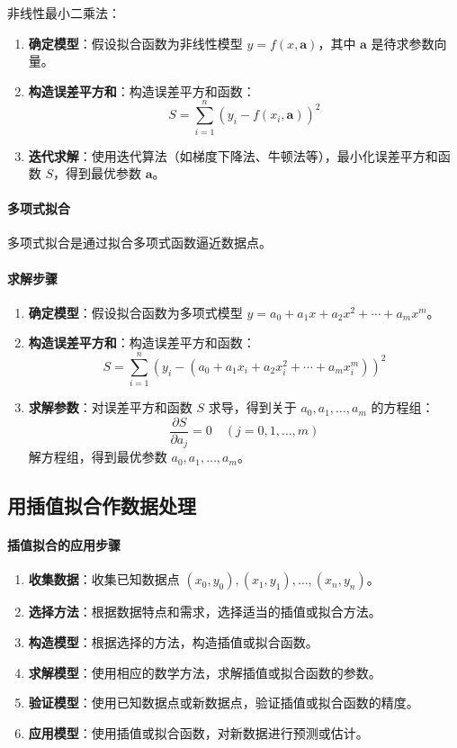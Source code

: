 \documentclass[UTF8]{ctexart}
\begin{document}
非线性最小二乘法：
\begin{enumerate}
    \item \textbf{确定模型}：假设拟合函数为非线性模型 \( y = f(x, \mathbf{a}) \)，其中 \( \mathbf{a} \) 是待求参数向量。
    \item \textbf{构造误差平方和}：构造误差平方和函数：
    \[
    S = \sum_{i=1}^{n} (y_i - f(x_i, \mathbf{a}))^2
    \]
    \item \textbf{迭代求解}：使用迭代算法（如梯度下降法、牛顿法等），最小化误差平方和函数 \( S \)，得到最优参数 \( \mathbf{a} \)。
\end{enumerate}

\paragraph{多项式拟合}
多项式拟合是通过拟合多项式函数逼近数据点。
\paragraph{求解步骤}
\begin{enumerate}
    \item \textbf{确定模型}：假设拟合函数为多项式模型 \( y = a_0 + a_1 x + a_2 x^2 + \cdots + a_m x^m \)。
    \item \textbf{构造误差平方和}：构造误差平方和函数：
    \[
    S = \sum_{i=1}^{n} (y_i - (a_0 + a_1 x_i + a_2 x_i^2 + \cdots + a_m x_i^m))^2
    \]
    \item \textbf{求解参数}：对误差平方和函数 \( S \) 求导，得到关于 \( a_0, a_1, \ldots, a_m \) 的方程组：
    \[
    \frac{\partial S}{\partial a_j} = 0 \quad (j=0, 1, \ldots, m)
    \]
    解方程组，得到最优参数 \( a_0, a_1, \ldots, a_m \)。
\end{enumerate}

\subsection {用插值拟合作数据处理}
\paragraph{插值拟合的应用步骤}
\begin{enumerate}
    \item \textbf{收集数据}：收集已知数据点 \( (x_0, y_0), (x_1, y_1), \ldots, (x_n, y_n) \)。
    \item \textbf{选择方法}：根据数据特点和需求，选择适当的插值或拟合方法。
    \item \textbf{构造模型}：根据选择的方法，构造插值或拟合函数。
    \item \textbf{求解模型}：使用相应的数学方法，求解插值或拟合函数的参数。
    \item \textbf{验证模型}：使用已知数据点或新数据点，验证插值或拟合函数的精度。
    \item \textbf{应用模型}：使用插值或拟合函数，对新数据进行预测或估计。
\end{enumerate}
\end{document}

